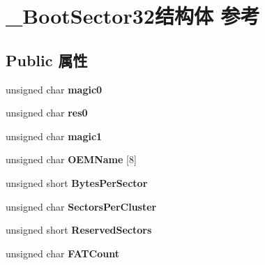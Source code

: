 \hypertarget{struct___boot_sector32}{}\section{\+\_\+\+Boot\+Sector32结构体 参考}
\label{struct___boot_sector32}
\subsection*{Public 属性}
\begin{DoxyCompactItemize}
\item 
\mbox{\label{struct___boot_sector32_a580ad2a91f7fd7c00c5d84ecc7e29817}} 
unsigned char {\bfseries magic0}
\item 
\mbox{\label{struct___boot_sector32_acf45c109268f27a81fcef082b970ab02}} 
unsigned char {\bfseries res0}
\item 
\mbox{\label{struct___boot_sector32_abdf9982ac2527f525de35be40d8676f1}} 
unsigned char {\bfseries magic1}
\item 
\mbox{\label{struct___boot_sector32_aa4efd20e7e4f942cdbdcf1bdcb57664e}} 
unsigned char {\bfseries O\+E\+M\+Name} \mbox{[}8\mbox{]}
\item 
\mbox{\label{struct___boot_sector32_ac3b4d15cd4fe69be545c0ff611ddae70}} 
unsigned short {\bfseries Bytes\+Per\+Sector}
\item 
\mbox{\label{struct___boot_sector32_a2e062e38c2b8df02eb4d2c7794f7e373}} 
unsigned char {\bfseries Sectors\+Per\+Cluster}
\item 
\mbox{\label{struct___boot_sector32_a77a76b24d2ec7f35ea2c8aa0dee01b0f}} 
unsigned short {\bfseries Reserved\+Sectors}
\item 
\mbox{\label{struct___boot_sector32_a44e46843bc13c229c7ca7b1289eaa01e}} 
unsigned char {\bfseries F\+A\+T\+Count}
\item 
\mbox{\label{struct___boot_sector32_af63ab01201d6e4ec73288621e649168a}} 

\end{DoxyCompactItemize}
